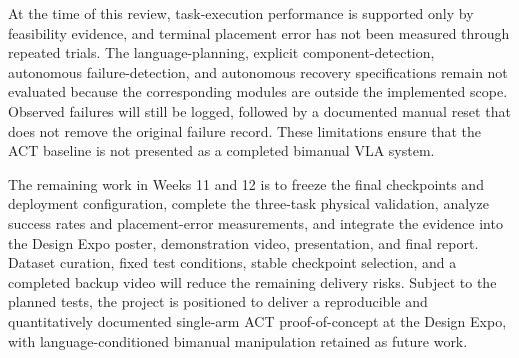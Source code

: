 \documentclass[12pt, letterpaper]{article}
\begin{document}
At the time of this review, task-execution performance is supported only by
feasibility evidence, and terminal placement error has not been measured through
repeated trials. The language-planning, explicit component-detection, autonomous
failure-detection, and autonomous recovery specifications remain not evaluated
because the corresponding modules are outside the implemented scope. Observed
failures will still be logged, followed by a documented manual reset that does
not remove the original failure record. These limitations ensure that the ACT
baseline is not presented as a completed bimanual VLA system.

The remaining work in Weeks 11 and 12 is to freeze the final checkpoints and
deployment configuration, complete the three-task physical validation, analyze
success rates and placement-error measurements, and integrate the evidence into
the Design Expo poster, demonstration video, presentation, and final report.
Dataset curation, fixed test conditions, stable checkpoint selection, and a
completed backup video will reduce the remaining delivery risks. Subject to the
planned tests, the project is positioned to deliver a reproducible and
quantitatively documented single-arm ACT proof-of-concept at the Design Expo,
with language-conditioned bimanual manipulation retained as future work.
\end{document}
